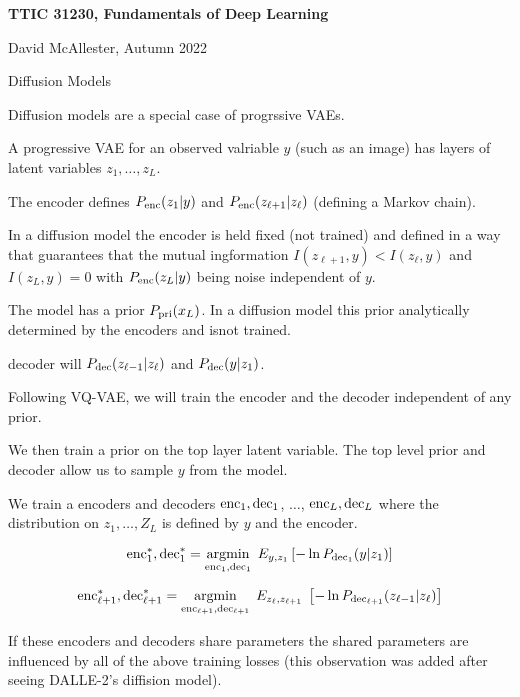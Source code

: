 





{\Huge

  \centerline{\bf TTIC 31230, Fundamentals of Deep Learning}
  \bigskip
  \centerline{David McAllester, Autumn 2022}
  \vfill
  \vfil
  \centerline{Diffusion Models}
  \vfill
  \vfill


Diffusion models are a special case of progrssive VAEs.

\vfill
A progressive VAE for an observed valriable $y$ (such as an image) has layers of latent variables $z_1,\dots,z_{L}$.

\vfill
The encoder defines $P_{\mathrm{enc}}(z_1|y)$ and $P_{\mathrm{enc}}(z_{\ell+1}|z_\ell)$ (defining a Markov chain).

\vfill
In a diffusion model the encoder is held fixed (not trained) and defined in a way that guarantees that
the mutual ingformation $I(z_{\ell+1},y) < I(z_\ell,y)$ and $I(z_L,y) = 0$ with $P_{\mathrm{enc}}(z_L|y)$ being noise independent of $y$.


\vfill
The model has a prior $P_{\mathrm{pri}}(x_L)$.  In a diffusion model this prior analytically determined by the encoders and isnot trained.

decoder will $P_{\mathrm{dec}}(z_{\ell-1}|z_\ell)$ and $P_{\mathrm{dec}}(y|z_1)$.

\vfill
Following VQ-VAE, we will train the encoder and the decoder independent of any prior.

\vfill
We then train a prior on the top layer latent variable.  The top level prior and decoder allow us to sample $y$ from the model.


We train a encoders and decoders $\mathrm{enc}_1,\mathrm{dec}_1$, $\ldots$, $\mathrm{enc}_L,\mathrm{dec}_L$ where the distribution on $z_1,\ldots,Z_L$ is defined by $y$ and the encoder.

$$\mathrm{enc}_1^*,\mathrm{dec}_1^* =\operatorname*{argmin}_{\mathrm{enc}_1,\mathrm{dec}_1}\;E_{y,z_1} \left[-\ln P_{\mathrm{dec}_1}(y|z_1)\right]$$

\vfill
$$\mathrm{enc}_{\ell+1}^*,\mathrm{dec}_{\ell+1}^* = \operatorname*{argmin}_{\mathrm{enc}_{\ell+1},\mathrm{dec}_{\ell+1}}\;E_{z_\ell,z_{\ell+1}}\;\left[-\ln P_{\mathrm{dec}_{\ell+1}}(z_{\ell-1}|z_\ell)\right]$$

\vfill
If these encoders and decoders share parameters the shared parameters are influenced by all of the above training losses (this observation was added
after seeing DALLE-2's diffision model).

}

